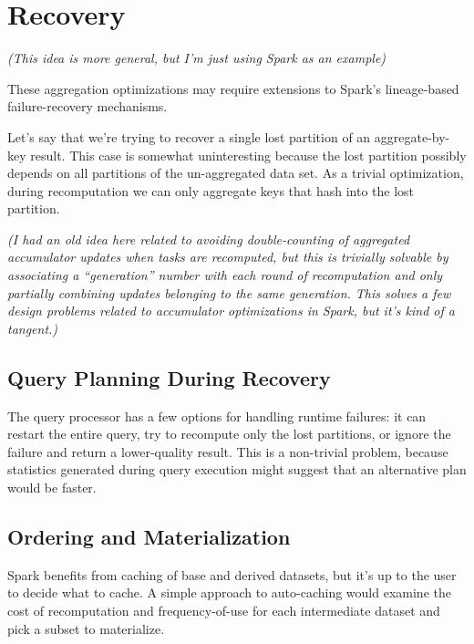 \documentclass[12pt]{article}
\begin{document}

\pagebreak

\section{Recovery}

\emph{(This idea is more general, but I'm just using Spark as an example)}

These aggregation optimizations may require extensions to Spark's lineage-based failure-recovery mechanisms.

Let's say that we're trying to recover a single lost partition of an
aggregate-by-key result.  This case is somewhat uninteresting because the lost
partition possibly depends on all partitions of the un-aggregated data set.
As a trivial optimization, during recomputation we can only aggregate keys
that hash into the lost partition.

\emph{(I had an old idea here related to avoiding double-counting of
aggregated accumulator updates when tasks are recomputed, but this is
trivially solvable by associating a ``generation'' number with each round of
recomputation and only partially combining updates belonging to the same
generation.  This solves a few design problems related to accumulator
optimizations in Spark, but it's kind of a tangent.)}

\subsection{Query Planning During Recovery}

The query processor has a few options for handling runtime failures: it can
restart the entire query, try to recompute only the lost partitions, or ignore
the failure and return a lower-quality result.  This is a non-trivial problem,
because statistics generated during query execution might suggest that an
alternative plan would be faster.

\subsection{Ordering and Materialization}

Spark benefits from caching of base and derived datasets, but it's up to the
user to decide what to cache.
A simple approach to auto-caching would examine the cost of recomputation and
frequency-of-use for each intermediate dataset and pick a subset to
materialize.
\end{document}
